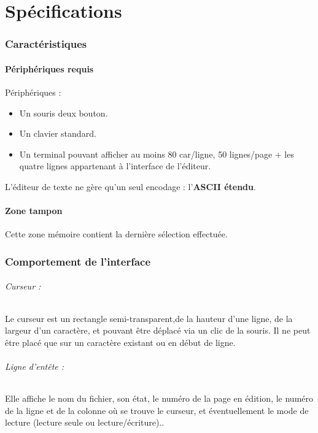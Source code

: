 \part{Spécifications}

\section{Caractéristiques}
\subsection{Périphériques requis}
Périphériques :
\begin{itemize}
	\item Un souris deux bouton.
	\item Un clavier standard.
	\item Un terminal pouvant afficher au moins 80 car/ligne, 50 lignes/page + les quatre lignes appartenant à l'interface de l'éditeur.\\
\end{itemize}

L'éditeur de texte ne gère qu'un seul encodage : l'\textbf{ASCII étendu}.

\subsection{Zone tampon}
Cette zone mémoire contient la dernière sélection effectuée.

\section{Comportement de l'interface}

\paragraph{Curseur :} Le curseur est un rectangle semi-transparent,de la hauteur d'une ligne, de la largeur d'un caractère, et pouvant être déplacé via un clic de la souris. Il ne peut être placé que sur un caractère existant ou en début de ligne.

\paragraph{Ligne d'entête :} Elle affiche le nom du fichier, son état, le
numéro de la page en édition, le numéro de la ligne et de la colonne où se
trouve le curseur, et éventuellement le mode de lecture (lecture seule ou
lecture/écriture)..

